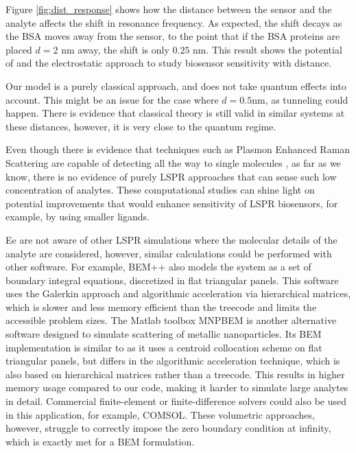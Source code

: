 Figure \ref{fig:dist_response} shows how the distance between the sensor 
and the analyte affects the shift in resonance frequency. As expected, the shift decays 
as the BSA moves away from the sensor, to the point that if the BSA proteins are placed
$d=2$ nm away, the shift is only $0.25$ nm. This result shows the potential of \pygbe 
and the electrostatic approach to study biosensor sensitivity with distance.

Our model is a purely classical approach, and does not take quantum effects into account.  
This might be an issue for the case where $d=0.5$nm, as tunneling could happen.
There is evidence that classical theory is still valid in similar systems
\cite{SavageETal2012, EstebanETal2012} at these distances, however, it is very close to 
the quantum regime.  

Even though there is evidence that techniques such as Plasmon Enhanced Raman Scattering are capable of detecting all the way to single molecules \cite{ZhangZhangETal2013}, 
as far as we know, there is no evidence of purely LSPR approaches that can sense such low concentration of analytes.
These computational studies can shine light on
potential improvements that would enhance sensitivity of LSPR biosensors, for example, by using
smaller ligands. 

Ee are not aware of other LSPR simulations where the molecular details of the analyte are considered, however, similar calculations could be performed with other software. 
For example, BEM++ \cite{SmigajETal2015} also models the system as a set of boundary integral equations, discretized in flat triangular panels. 
This software uses the Galerkin approach and algorithmic acceleration via hierarchical matrices, which is slower and less memory efficient than the treecode and limits the accessible problem sizes.
The Matlab toolbox MNPBEM \cite{HohenesterTrugler2012} is another alternative software designed to simulate scattering of metallic nanoparticles.
Its BEM implementation is similar to \pygbe as it uses a centroid collocation scheme on flat triangular panels, but differs in the algorithmic acceleration technique, which is also based on hierarchical matrices rather than a treecode. 
This results in higher memory usage compared to our code, making it harder to simulate large analytes in detail.
Commercial finite-element or finite-difference solvers could also be used in this application, for example, COMSOL. 
These volumetric approaches, however, struggle to correctly impose the zero boundary condition at infinity, which is exactly met for a BEM formulation.
